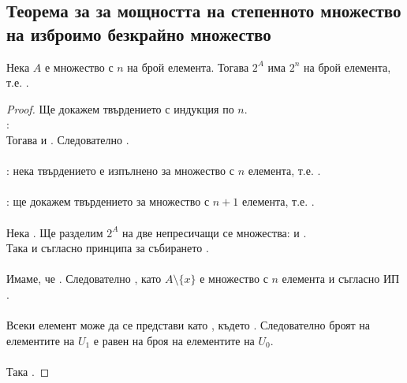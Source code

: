 \subsection*{Теорема за за мощността на степенното множество на изброимо безкрайно множество}
\begin{theorem}
    Нека \(A\) е множество с \(n\) на брой елемента. Тогава \(2^A\) има \(2^n\) на брой елемента, т.е. 
    .
\end{theorem}
\begin{proof}
    Ще докажем твърдението с индукция по \(n\). \\
    :  \\
    Тогава  и .
    Следователно . \\ \\
    : нека твърдението е изпълнено за множество с \(n\) елемента, т.е. 
    . \\ \\
    : ще докажем твърдението за множество с \(n + 1\) елемента, т.е. 
    . \\ \\
    Нека . Ще разделим \(2^A\) на две непресичащи се множества:
     и . \\
    Така  и съгласно принципа за събирането . \\ \\
    Имаме, че . Следователно , 
    като \(A \setminus \{x\}\) е множество с \(n\) елемента и съгласно ИП . \\ \\
    Всеки елемент  може да се представи като , където .
    Следователно броят на елементите на \(U_1\) е равен на броя на елементите на \(U_0\). \\ \\
    Така .
\end{proof}

